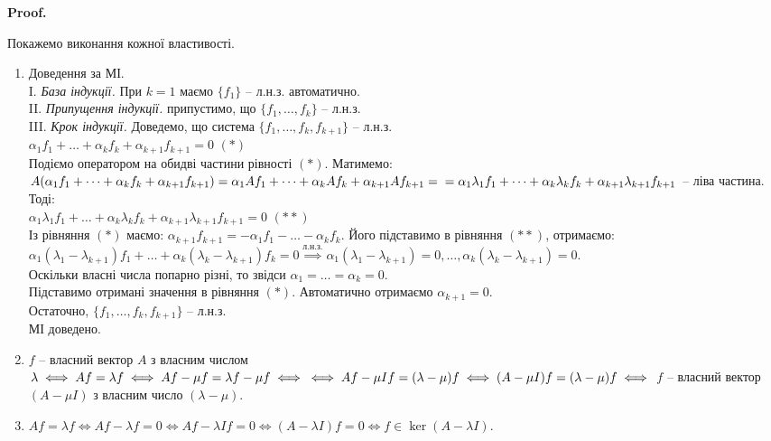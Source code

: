\documentclass[a4paper, 10pt]{article}
\makeatletter
\theoremstyle{theoremdd}
\renewenvironment{proof}[1][Proof.\\]{\par
\pushQED{\hfill \qed}%
\normalfont \topsep6\p@\@plus6\p@\relax
\trivlist
\item\relax
{\bfseries
#1\@addpunct{.}}\hspace\labelsep\ignorespaces
}{%
\popQED\endtrivlist\@endpefalse
}
\makeatother
\begin{document}
\begin{proof}
Покажемо виконання кожної властивості.
\begin{enumerate}[wide=0pt, label={\arabic*)},topsep=-\parskip]
\item Доведення за МІ.\\
I. \textit{База індукції.} При $k=1$ маємо $\{f_1\}$ -- л.н.з. автоматично.\\
II. \textit{Припущення індукції.} припустимо, що $\{f_1,\dots,f_k\}$ -- л.н.з. \\
III. \textit{Крок індукції.} Доведемо, що система $\{f_1,\dots,f_k, f_{k+1}\}$ -- л.н.з.\\
$\alpha_1 f_1 + \dots + \alpha_k f_k + \alpha_{k+1} f_{k+1} = 0$ $(*)$\\
Подіємо оператором на обидві частини рівності $(*)$. Матимемо:\\
$A(\alpha_1 f_1 + \dots + \alpha_k f_k + \alpha_{k+1} f_{k+1}) = \alpha_1 Af_1 + \dots + \alpha_k Af_k + \alpha_{k+1} Af_{k+1} = \\ = \alpha_1 \lambda_1 f_1 + \dots + \alpha_k \lambda_k f_k + \alpha_{k+1} \lambda_{k+1} f_{k+1}$ -- ліва частина. Тоді:\\
$\alpha_1 \lambda_1 f_1 + \dots + \alpha_k \lambda_k f_k + \alpha_{k+1} \lambda_{k+1} f_{k+1} = 0$ $(**)$\\
Із рівняння $(*)$ маємо: $\alpha_{k+1}f_{k+1} = -\alpha_1 f_1 - \dots - \alpha_k f_k$. Його підставимо в рівняння $(**)$, отримаємо:\\
$\alpha_1 (\lambda_1 - \lambda_{k+1})f_1 + \dots + \alpha_k (\lambda_k - \lambda_{k+1})f_k = 0 \overset{\textrm{л.н.з.}}{\implies} \alpha_1(\lambda_1 - \lambda_{k+1})=0, \dots, \alpha_k(\lambda_k - \lambda_{k+1}) = 0$.\\
Оскільки власні числа попарно різні, то звідси $\alpha_1 = \dots = \alpha_k = 0$.\\
Підставимо отримані значення в рівняння $(*)$. Автоматично отримаємо $\alpha_{k+1} = 0$.\\
Остаточно, $\{f_1,\dots,f_k, f_{k+1}\}$ -- л.н.з.\\
МІ доведено.

\item $f$ -- власний вектор $A$ з власним числом $\lambda \iff Af = \lambda f \iff Af - \mu f = \lambda f - \mu f \iff \\ \iff Af - \mu If = (\lambda - \mu)f \iff (A-\mu I)f = (\lambda - \mu)f \iff$ $f$ -- власний вектор $(A- \mu I)$ з власним число $(\lambda - \mu)$.

\item $Af = \lambda f \iff Af - \lambda f = 0 \iff Af - \lambda If = 0 \iff (A-\lambda I)f = 0 \iff f \in \ker(A - \lambda I)$.


\end{enumerate}
\end{proof}
\end{document}
